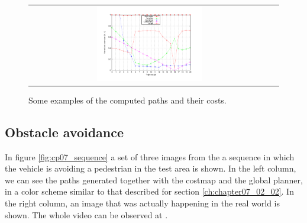 \begin{figure}[h!]
\begin{tabular}{cc}
\includegraphics[width=0.45\textwidth,trim=50 40 80 60,clip]{costs17}\label{fig:cp07_example9}
\end{tabular}
\caption{Some examples of the computed paths and their costs.}\label{fig:cp07_examples}
\end{figure}


\subsection{Obstacle avoidance}\label{ch:chapter07_02_03}

In figure \ref{fig:cp07_sequence} a set of three images from the a sequence in which the vehicle is avoiding a pedestrian in the test area is shown. In the left column, we can see the paths generated together with the costmap and the global planner, in a color scheme similar to that described for section \ref{ch:chapter07_02_02}. In the right column, an image that was actually happening in the real world is shown. The whole video can be observed at .


